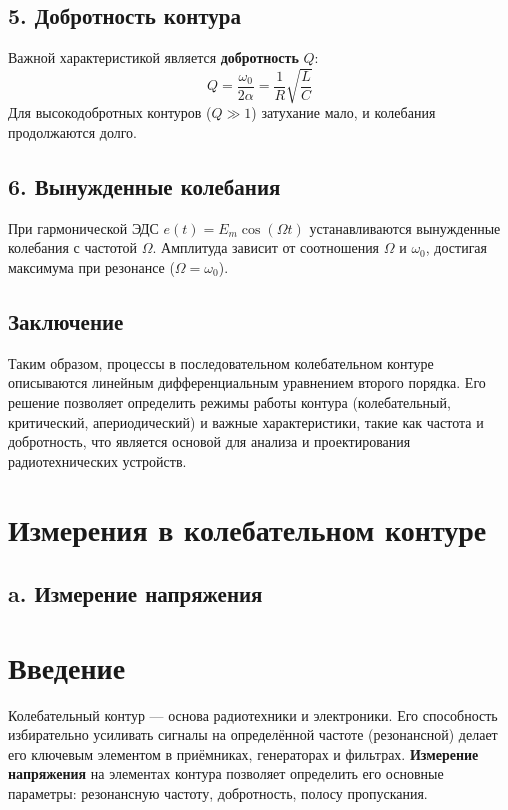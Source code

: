 \documentclass[a4paper]{article}
\begin{document}
\subsection*{5. Добротность контура}

Важной характеристикой является \textbf{добротность} $Q$:
\[
Q = \frac{\omega_0}{2\alpha} = \frac{1}{R} \sqrt{\frac{L}{C}}
\]
Для высокодобротных контуров ($Q \gg 1$) затухание мало, и колебания продолжаются долго.

\subsection*{6. Вынужденные колебания}

При гармонической ЭДС $e(t) = E_m \cos(\Omega t)$ устанавливаются вынужденные колебания с частотой $\Omega$. Амплитуда зависит от соотношения $\Omega$ и $\omega_0$, достигая максимума при резонансе ($\Omega = \omega_0$).

\subsection*{Заключение}

Таким образом, процессы в последовательном колебательном контуре описываются линейным дифференциальным уравнением второго порядка. Его решение позволяет определить режимы работы контура (колебательный, критический, апериодический) и важные характеристики, такие как частота и добротность, что является основой для анализа и проектирования радиотехнических устройств.


\section{Измерения в колебательном контуре}
\subsection{a.	Измерение напряжения}

\section*{Введение}
Колебательный контур — основа радиотехники и электроники. Его способность избирательно усиливать сигналы на определённой частоте (резонансной) делает его ключевым элементом в приёмниках, генераторах и фильтрах. \textbf{Измерение напряжения} на элементах контура позволяет определить его основные параметры: резонансную частоту, добротность, полосу пропускания.
\end{document}
